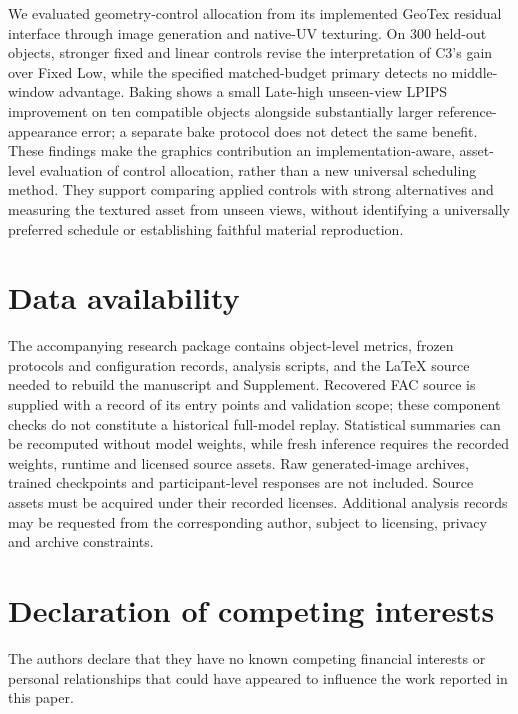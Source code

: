 \documentclass[times,twocolumn,final]{elsarticle}
\begin{document}
We evaluated geometry-control allocation from its implemented GeoTex residual interface through image generation and native-UV texturing. On 300 held-out objects, stronger fixed and linear controls revise the interpretation of C3's gain over Fixed Low, while the specified matched-budget primary detects no middle-window advantage. Baking shows a small Late-high unseen-view LPIPS improvement on ten compatible objects alongside substantially larger reference-appearance error; a separate bake protocol does not detect the same benefit. These findings make the graphics contribution an implementation-aware, asset-level evaluation of control allocation, rather than a new universal scheduling method. They support comparing applied controls with strong alternatives and measuring the textured asset from unseen views, without identifying a universally preferred schedule or establishing faithful material reproduction.

\section*{Data availability}

The accompanying research package contains object-level metrics, frozen protocols and configuration records, analysis scripts, and the LaTeX source needed to rebuild the manuscript and Supplement. Recovered FAC source is supplied with a record of its entry points and validation scope; these component checks do not constitute a historical full-model replay. Statistical summaries can be recomputed without model weights, while fresh inference requires the recorded weights, runtime and licensed source assets. Raw generated-image archives, trained checkpoints and participant-level responses are not included. Source assets must be acquired under their recorded licenses. Additional analysis records may be requested from the corresponding author, subject to licensing, privacy and archive constraints.

\section*{Declaration of competing interests}

The authors declare that they have no known competing financial interests or personal relationships that could have appeared to influence the work reported in this paper.
\end{document}
